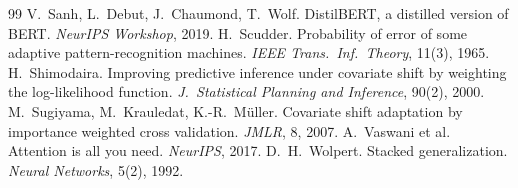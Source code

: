 \documentclass[11pt,a4paper]{article}
\begin{document}
\begin{thebibliography}{99}
 V.~Sanh, L.~Debut, J.~Chaumond, T.~Wolf. DistilBERT, a distilled version of BERT. \emph{NeurIPS Workshop}, 2019.
 H.~Scudder. Probability of error of some adaptive pattern-recognition machines. \emph{IEEE Trans.\ Inf.\ Theory}, 11(3), 1965.
 H.~Shimodaira. Improving predictive inference under covariate shift by weighting the log-likelihood function. \emph{J.\ Statistical Planning and Inference}, 90(2), 2000.
 M.~Sugiyama, M.~Krauledat, K.-R.~M\"uller. Covariate shift adaptation by importance weighted cross validation. \emph{JMLR}, 8, 2007.
 A.~Vaswani et al. Attention is all you need. \emph{NeurIPS}, 2017.
 D.~H.~Wolpert. Stacked generalization. \emph{Neural Networks}, 5(2), 1992.
\end{thebibliography}
\end{document}
